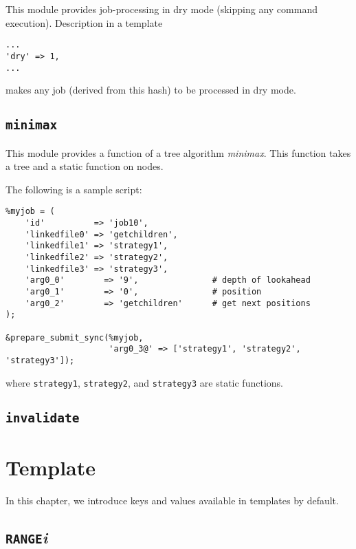\documentclass[a4paper,10pt]{report}
\begin{document}
This module provides job-processing in dry mode (skipping any command
execution).  Description in a template
\begin{boxnote}
\begin{verbatim}
...
'dry' => 1,
...
\end{verbatim}
\end{boxnote}
\noindent
makes any job (derived from this hash) to be processed in dry mode.

\section{\texttt{minimax}}

This module provides a function of a tree algorithm \textit{minimax}.
This function takes a tree and a static function on nodes.

The following is a sample script:
\begin{boxnote}
\begin{verbatim}
%myjob = (
    'id'          => 'job10',
    'linkedfile0' => 'getchildren',
    'linkedfile1' => 'strategy1',
    'linkedfile2' => 'strategy2',
    'linkedfile3' => 'strategy3',
    'arg0_0'        => '9',               # depth of lookahead
    'arg0_1'        => '0',               # position
    'arg0_2'        => 'getchildren'      # get next positions
);

&prepare_submit_sync(%myjob,
                     'arg0_3@' => ['strategy1', 'strategy2', 'strategy3']);
\end{verbatim}
\end{boxnote}
\noindent
where \texttt{strategy1}, \texttt{strategy2}, and
\texttt{strategy3} are static functions.

\section{\texttt{invalidate}}



\chapter{Template}\label{chapjobdefhash}

In this chapter, we introduce keys and values available in templates
by default.

\section{\texttt{RANGE}\textit{i}}
\end{document}
